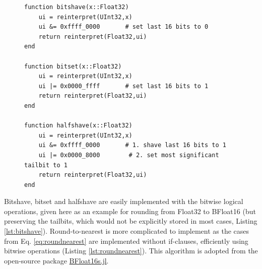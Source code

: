 \begin{figure}[tbhp]
\begin{lstlisting}[language=JuliaLocal, label=lst:bitshave, caption={\textbf{Bitwise implementation of bitshave, bitset and halfshave for
rounding to 7 mantissa bits.} Bitshave rounds a Float32 $x$ to $n_m = 7$ mantissa bits (equivalent to a BFloat16, but the tailing
bits remain stored) to \texttt{0} using the bitwise logical-and operation \&. For other number of mantissa bits to be retained the mask
\texttt{0xffff\_0000} has to be changed, e.g. \texttt{0xffff\_e000} will round to $n_m = 10$ mantissa bits. The function \texttt{reinterpret}
leaves the bits unchanged but changes the associated type. Bitset similar to bitshave but with the logical-or operation $\vert$ which
sets the tailing bits to \texttt{1}. Halfshave similar to bitshave but the tailing bits are replaced by \texttt{100$...$0}.}]
function bitshave(x::Float32)
	ui = reinterpret(UInt32,x)
	ui &= 0xffff_0000	    # set last 16 bits to 0
	return reinterpret(Float32,ui)
end

function bitset(x::Float32)
	ui = reinterpret(UInt32,x)
	ui |= 0x0000_ffff    	# set last 16 bits to 1
	return reinterpret(Float32,ui)
end

function halfshave(x::Float32)
	ui = reinterpret(UInt32,x)
	ui &= 0xffff_0000    	# 1. shave last 16 bits to 1
	ui |= 0x0000_8000        # 2. set most significant tailbit to 1
	return reinterpret(Float32,ui)
end
\end{lstlisting}
\end{figure}
Bitshave, bitset and halfshave are easily implemented with the bitwise logical operations, given here as an example for rounding from
Float32 to BFloat16 (but preserving the tailbits, which would not be explicitly stored in most cases, Listing \ref{lst:bitshave}). Round-to-nearest
is more complicated to implement as the cases from Eq. \ref{eq:roundnearest} are implemented without if-clauses, efficiently using bitwise
operations (Listing \ref{lst:roundnearest}). This algorithm is adopted from the open-source package
\href{https://github.com/JuliaComputing/BFloat16s.jl}{BFloat16s.jl}.

